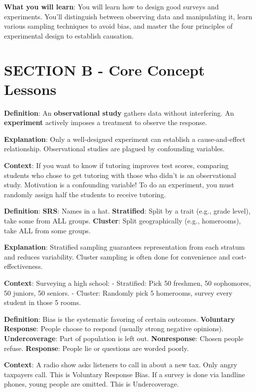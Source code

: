 \textbf{What you will learn}: You will learn how to design good surveys and experiments. You'll distinguish between observing data and manipulating it, learn various sampling techniques to avoid bias, and master the four principles of experimental design to establish causation.

\section{SECTION B - Core Concept Lessons}

\begin{lessonbox}
\textbf{Definition}: An \textbf{observational study} gathers data without interfering. An \textbf{experiment} actively imposes a treatment to observe the response.

\textbf{Explanation}: Only a well-designed experiment can establish a cause-and-effect relationship. Observational studies are plagued by confounding variables.

\textbf{Context}: If you want to know if tutoring improves test scores, comparing students who chose to get tutoring with those who didn't is an observational study. Motivation is a confounding variable! To do an experiment, you must randomly assign half the students to receive tutoring.
\end{lessonbox}

\begin{lessonbox}
\textbf{Definition}: 
\textbf{SRS}: Names in a hat. 
\textbf{Stratified}: Split by a trait (e.g., grade level), take some from ALL groups.
\textbf{Cluster}: Split geographically (e.g., homerooms), take ALL from some groups.

\textbf{Explanation}: Stratified sampling guarantees representation from each stratum and reduces variability. Cluster sampling is often done for convenience and cost-effectiveness.

\textbf{Context}: Surveying a high school:
- Stratified: Pick 50 freshmen, 50 sophomores, 50 juniors, 50 seniors.
- Cluster: Randomly pick 5 homerooms, survey every student in those 5 rooms.
\end{lessonbox}

\begin{lessonbox}
\textbf{Definition}: Bias is the systematic favoring of certain outcomes. 
\textbf{Voluntary Response}: People choose to respond (usually strong negative opinions).
\textbf{Undercoverage}: Part of population is left out.
\textbf{Nonresponse}: Chosen people refuse.
\textbf{Response}: People lie or questions are worded poorly.

\textbf{Context}: A radio show asks listeners to call in about a new tax. Only angry taxpayers call. This is Voluntary Response Bias. If a survey is done via landline phones, young people are omitted. This is Undercoverage.
\end{lessonbox}

